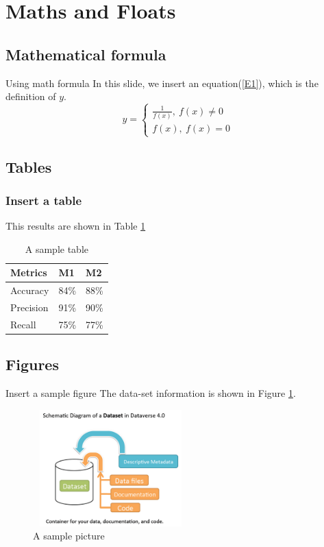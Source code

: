 \documentclass[aspectratio=169, 12pt]{beamer}    %
\begin{document}
\section{Maths and Floats}
\subsection{Mathematical formula}
\begin{frame}{Using math formula}
In this slide, we insert an equation(\ref{E1}), which is the definition of $y$.
\begin{equation}
    \label{E1}
    y = 
    \begin{cases}
    \frac{1}{f(x)},\ f(x) \neq 0 \\
    f(x), \ f(x) = 0
    \end{cases}
\end{equation}
\end{frame}


\subsection{Tables}
\begin{frame}
\frametitle{Insert a table}
This results are shown in Table \ref{T1}
\begin{table}[ht]   
    \caption{A sample table}
    \label{T1}
    \centering
    \begin{tabular}{p{1.5cm}|p{1.5cm}|p{1.5cm}}
    \hline
    Metrics     &   M1      &   M2      \\
    \hline
    Accuracy    &   84\%    &   88\%     \\
    Precision   &   91\%    &   90\%     \\
    Recall      &   75\%    &   77\%     \\
    \hline
    \end{tabular}
\end{table}
\end{frame}

\subsection{Figures}
\begin{frame}{Insert a sample figure}
The data-set information is shown in Figure \ref{fig:dataset}.
\begin{figure}
    \centering
    \includegraphics[width=6cm,height=4.5cm]{figs/dataset.png}
    \caption{A sample picture}
    \label{fig:dataset}
\end{figure}
\end{frame}
\end{document}
